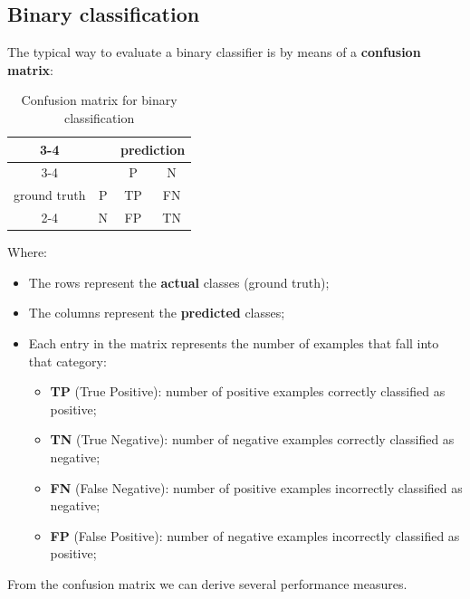 \subsection{Binary classification}
The typical way to evaluate a binary classifier is by means of a \textbf{confusion matrix}:
\begin{table}[ht]
	\centering
	\begin{tabular}{cc|cc|}
		\cline{3-4}                                         &   & \multicolumn{2}{c|}{prediction} \\
		\cline{3-4}                                         &   & \multicolumn{1}{c|}{P}         & N  \\
		\hline
		\multicolumn{1}{|c|}{ground truth} & P & \multicolumn{1}{c|}{TP}        & FN \\
		\cline{2-4} \multicolumn{1}{|c|}{}                  & N & \multicolumn{1}{c|}{FP}        & TN \\
		\hline
	\end{tabular}
	\caption{Confusion matrix for binary classification}
	\label{fig:binClassConfusionMatrix}
\end{table}
Where:
\begin{itemize}
	\item The rows represent the \textbf{actual} classes (ground truth);
	\item The columns represent the \textbf{predicted} classes;
	\item Each entry in the matrix represents the number of examples that fall into that category:
	\begin{itemize}
		\item \textbf{TP} (True Positive): number of positive examples correctly classified as positive;
		\item \textbf{TN} (True Negative): number of negative examples correctly classified as negative;
		\item \textbf{FN} (False Negative): number of positive examples incorrectly classified as negative;
		\item \textbf{FP} (False Positive): number of negative examples incorrectly classified as positive;
	\end{itemize}
\end{itemize}
From the confusion matrix we can derive several performance measures.

